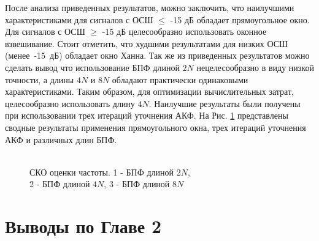 После анализа приведенных результатов, можно заключить, что наилучшими характеристиками для сигналов с ОСШ ${\le}$ -15 дБ обладает прямоугольное окно. Для сигналов с ОСШ ${\ge}$ 
-15 дБ целесообразно использовать оконное взвешивание. Стоит отметить, что худшими результатами для низких ОСШ \mbox{(менее -15 дБ)} обладает окно Ханна.
Так же из приведенных результатов можно сделать вывод что использование БПФ длиной ${2N}$ нецелесообразно в виду низкой
точности, а длины ${4N}$ и ${8N}$ обладают практически одинаковыми характеристиками. Таким образом, для оптимизации вычислительных затрат, целесообразно использовать длину ${4N}$. Наилучшие результаты были получены при
использовании трех итераций уточнения АКФ. На Рис. \ref{pic:2vs4vs8} представлены сводные результаты применения прямоугольного окна, трех итераций уточнения АКФ и различных длин БПФ.

\begin{figure}[h]
	\center{}
	\caption{\\СКО оценки частоты. 1 - БПФ длиной ${2N}$,\\2 - БПФ длиной ${4N}$, 3 - БПФ длиной ${8N}$}
	\label{pic:2vs4vs8}
\end{figure}


\section{Выводы по Главе 2}

